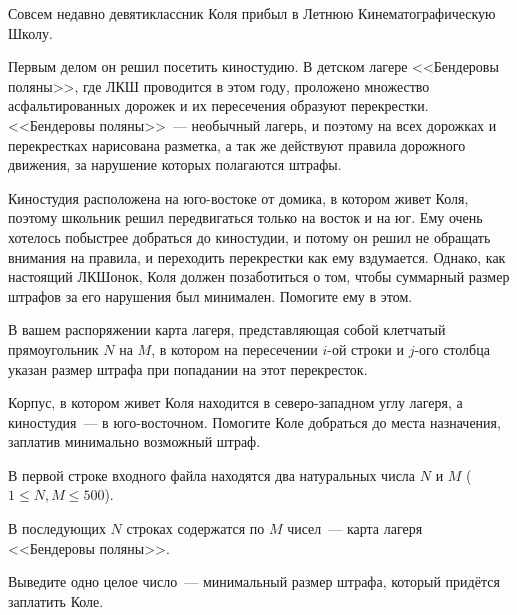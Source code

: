 

Совсем недавно девятиклассник Коля прибыл в Летнюю Кинематографическую Школу. 

Первым делом он решил посетить киностудию. В детском лагере <<Бендеровы поляны>>, где ЛКШ проводится в этом году, проложено множество асфальтированных дорожек и их пересечения образуют перекрестки. <<Бендеровы поляны>>~--- необычный лагерь, и поэтому на всех дорожках и перекрестках нарисована разметка, а так же действуют правила дорожного движения, за нарушение которых полагаются штрафы.

Киностудия расположена на юго-востоке от домика, в котором живет Коля, поэтому школьник решил передвигаться только на восток и на юг. Ему очень хотелось побыстрее добраться до киностудии, и потому он решил не обращать внимания на правила, и переходить перекрестки как ему вздумается. Однако, как настоящий ЛКШонок, Коля должен позаботиться о том, чтобы суммарный размер штрафов за его нарушения был минимален. 
Помогите ему в этом.

В вашем распоряжении карта лагеря, представляющая собой клетчатый прямоугольник $N$ на $M$, в котором на пересечении $i$-ой строки и $j$-ого столбца указан размер штрафа при попадании на этот перекресток.

Корпус, в котором живет Коля находится в северо-западном углу лагеря, а киностудия~--- в юго-восточном. Помогите Коле добраться до места назначения, заплатив минимально возможный штраф.

\InputFile
В первой строке входного файла находятся два натуральных числа $N$ и $M$ ($1 \le N, M \le 500$).

В последующих $N$ строках содержатся по $M$ чисел~--- карта лагеря <<Бендеровы поляны>>.


\OutputFile
Выведите одно целое число~--- минимальный размер штрафа,
который придётся заплатить Коле.

